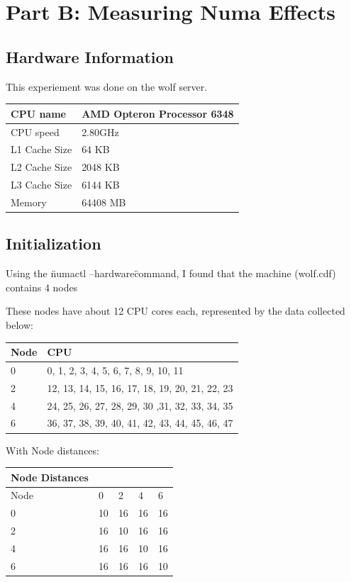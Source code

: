 \documentclass{article}
\begin{document}
\section{Part B: Measuring Numa Effects}
\subsection{Hardware Information}

This experiement was done on the wolf server.

\begin{center}
\begin{tabular}{|l|l|}
  	\hline
  	CPU name & AMD Opteron Processor 6348\\ \hline
  	CPU speed & 2.80GHz \\ \hline
  	L1 Cache Size & 64 KB \\ \hline
	L2 Cache Size & 2048 KB \\ \hline
	L3 Cache Size & 6144 KB \\ \hline
	Memory & 64408 MB \\ \hline
\end{tabular}
\end{center}

\subsection{Initialization}

Using the \"numactl --hardware\" command, I found that the machine (wolf.cdf) contains 4 nodes 

These nodes have about 12 CPU cores each, represented by the data collected below:

\begin{center}
\begin{tabular}{|l|l|}
  \hline
  Node & CPU \\ \hline
  0 & 0, 1, 2, 3, 4, 5, 6, 7, 8, 9, 10, 11 \\ \hline
  2 & 12, 13, 14, 15, 16, 17, 18, 19, 20, 21, 22, 23 \\ \hline
  4 & 24, 25, 26, 27, 28, 29, 30 ,31, 32, 33, 34, 35 \\ \hline
  6 & 36, 37, 38, 39, 40, 41, 42, 43, 44, 45, 46, 47 \\ \hline
\end{tabular}
\end{center}

With Node distances:

\begin{center}
\begin{tabular}{|l|l|l|l|l|}
	\hline
	Node Distances \\ \hline
	Node & 0 & 2 & 4 & 6 \\ \hline
  	0 & 10 & 16 & 16 & 16 \\ \hline
  	2 & 16 & 10 & 16 & 16 \\ \hline
  	4 & 16 & 16 & 10 & 16 \\ \hline
  	6 & 16 & 16 & 16 & 10 \\ \hline

\end{tabular}
\end{center}
\end{document}

